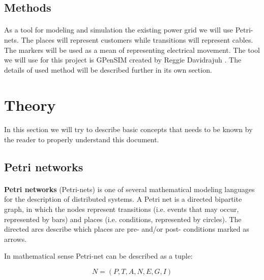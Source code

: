 \documentclass[a4paper]{article}
\begin{document}
\subsection{Methods}
\label{sec:methods}
\paragraph{}

As a tool for modeling and simulation the existing power grid we will use Petri-nets. The places will represent customers while transitions will represent cables. The markers will be used as a mean of representing electrical movement. The tool we will use for this project is GPenSIM created by Reggie Davidrajuh \cite{Art2}. The details of used method will be described further in its own section.

\clearpage

%
\section{Theory}
\label{cha:theory}
\paragraph{}

In this section we will try to describe basic concepts that needs to be known by the reader to properly understand this document.

\subsection{Petri networks}
\label{sec:petriNetworks}
\paragraph{}

\textbf{Petri networks} (Petri-nets) is one of several mathematical modeling languages for the description of distributed systems. A Petri net is a directed bipartite graph, in which the nodes represent transitions (i.e. events that may occur, represented by bars) and places (i.e. conditions, represented by circles). The directed arcs describe which places are pre- and/or post- conditions marked  as arrows. \cite{Art3}

In mathematical sense Petri-net can be described as a tuple:

\begin{equation}
N = ( P, T, A, N, E, G, I )
\end{equation}
\end{document}
